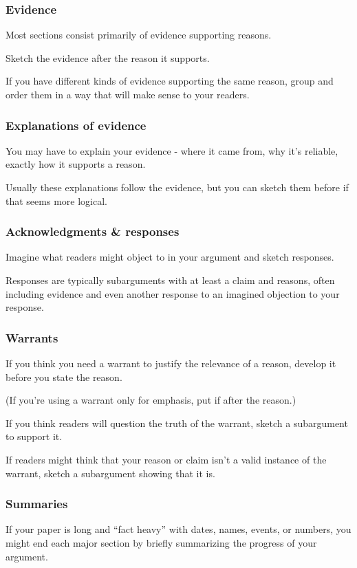 \documentclass[oneside]{book}
\numberwithin{equation}{section}
\begin{document}
\subsubsection{Evidence}
Most sections consist primarily of evidence supporting reasons.

Sketch the evidence after the reason it supports.

If you have different kinds of evidence supporting the same reason, group and order them in a way that will make sense to your readers.

\subsubsection{Explanations of evidence}
You may have to explain your evidence - where it came from, why it's reliable, exactly how it supports a reason.

Usually these explanations follow the evidence, but you can sketch them before if that seems more logical.

\subsubsection{Acknowledgments \& responses}
Imagine what readers might object to in your argument and sketch responses.

Responses are typically subarguments with at least a claim and reasons, often including evidence and even another response to an imagined objection to your response.

\subsubsection{Warrants}
If you think you need a warrant to justify the relevance of a reason, develop it before you state the reason.

(If you're using a warrant only for emphasis, put if after the reason.)

If you think readers will question the truth of the warrant, sketch a subargument to support it.

If readers might think that your reason or claim isn't a valid instance of the warrant, sketch a subargument showing that it is.

\subsubsection{Summaries}
If your paper is long and ``fact heavy'' with dates, names, events, or numbers, you might end each major section by briefly summarizing the progress of your argument.
\end{document}
